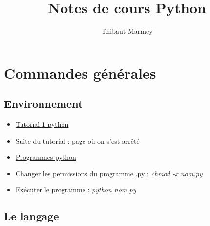 \documentclass[12pt,a4paper]{article}
\author{Thibaut Marmey}
\title{Notes de cours Python}
\begin{document}
	\maketitle

\begin{normalsize}
\tableofcontents
\end{normalsize}

\section{Commandes générales}
\subsection{Environnement}
\begin{itemize}
\item \href{https://docs.python.org/3/tutorial/index.html}{Tutorial 1 python}
\item \href{https://docs.python.org/fr/3/tutorial/controlflow.html}{Suite du tutorial : page où on s'est arrêté}
\item \href{run:../Test Python/}{Programmes python}
\item Changer les permissions du programme .py : \textit{chmod -x nom.py}
\item Exécuter le programme : \textit{python nom.py}
\end{itemize}

\subsection{Le langage}
\end{document}
